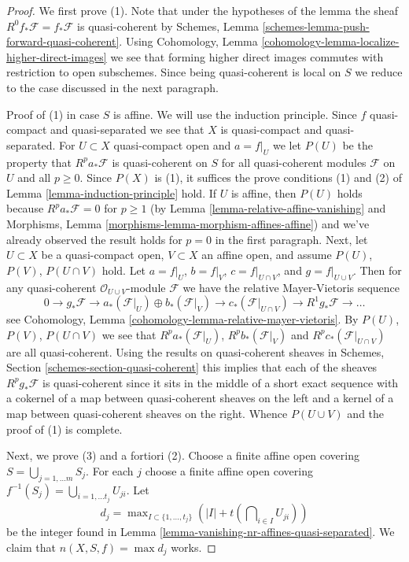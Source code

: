 \documentclass{stacks-project}
\theoremstyle{plain}
\theoremstyle{definition}
\theoremstyle{remark}
\numberwithin{equation}{subsection}
\begin{document}
\begin{proof}
We first prove (1). Note that under the hypotheses of the lemma the sheaf
$R^0f_*\mathcal{F} = f_*\mathcal{F}$ is quasi-coherent by
Schemes, Lemma \ref{schemes-lemma-push-forward-quasi-coherent}.
Using
Cohomology, Lemma \ref{cohomology-lemma-localize-higher-direct-images}
we see that forming higher direct images commutes with restriction
to open subschemes. Since being quasi-coherent is local on $S$ we
reduce to the case discussed in the next paragraph.

\medskip\noindent
Proof of (1) in case $S$ is affine. We will use the induction principle.
Since $f$ quasi-compact and quasi-separated we see that $X$
is quasi-compact and quasi-separated. For $U \subset X$
quasi-compact open and $a = f|_U$ we let $P(U)$ be the property that
$R^pa_*\mathcal{F}$ is quasi-coherent on $S$ for all quasi-coherent modules
$\mathcal{F}$ on $U$ and all $p \geq 0$. Since $P(X)$ is (1), it suffices
the prove conditions (1) and (2) of Lemma \ref{lemma-induction-principle} hold.
If $U$ is affine, then $P(U)$ holds because $R^pa_*\mathcal{F} = 0$ for
$p \geq 1$ (by  Lemma \ref{lemma-relative-affine-vanishing} and
Morphisms, Lemma \ref{morphisms-lemma-morphism-affines-affine})
and we've already observed the result holds for $p = 0$ in the first
paragraph. Next, let $U \subset X$ be a quasi-compact open, $V \subset X$
an affine open, and assume $P(U)$, $P(V)$, $P(U \cap V)$ hold.
Let $a = f|_U$, $b = f|_V$, $c = f|_{U \cap V}$, and $g = f|_{U \cup V}$.
Then for any quasi-coherent $\mathcal{O}_{U \cup V}$-module $\mathcal{F}$
we have the relative Mayer-Vietoris sequence
$$
0 \to
g_*\mathcal{F} \to
a_*(\mathcal{F}|_U) \oplus b_*(\mathcal{F}|_V) \to
c_*(\mathcal{F}|_{U \cap V}) \to
R^1g_*\mathcal{F} \to \ldots
$$
see Cohomology, Lemma \ref{cohomology-lemma-relative-mayer-vietoris}.
By $P(U)$, $P(V)$, $P(U \cap V)$ we see that
$R^pa_*(\mathcal{F}|_U)$, $R^pb_*(\mathcal{F}|_V)$ and
$R^pc_*(\mathcal{F}|_{U \cap V})$ are all quasi-coherent.
Using the results on quasi-coherent sheaves in
Schemes, Section \ref{schemes-section-quasi-coherent}
this implies that each of the sheaves
$R^pg_*\mathcal{F}$ is quasi-coherent since it sits in the middle of a short
exact sequence with a cokernel of a map between quasi-coherent sheaves
on the left and a kernel of a map between quasi-coherent sheaves on the right.
Whence $P(U \cup V)$ and the proof of (1) is complete.

\medskip\noindent
Next, we prove (3) and a fortiori (2). Choose a finite affine open
covering $S = \bigcup_{j = 1, \ldots m} S_j$. For each $j$ choose
a finite affine open covering
$f^{-1}(S_j) = \bigcup_{i = 1, \ldots t_j} U_{ji} $.
Let
$$
d_j = \max\nolimits_{I \subset \{1, \ldots, t_j\}}
\left(|I| + t(\bigcap\nolimits_{i \in I} U_{ji})\right)
$$
be the integer found in
Lemma \ref{lemma-vanishing-nr-affines-quasi-separated}.
We claim that $n(X, S, f) = \max d_j$ works.


\end{proof}
\end{document}

